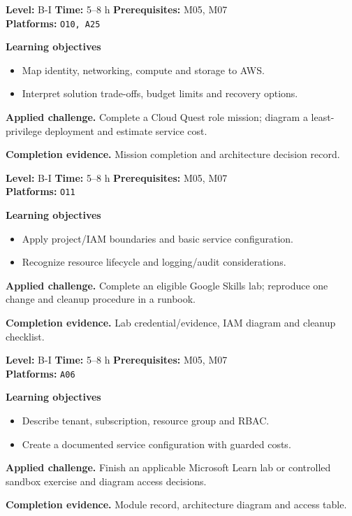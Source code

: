 \documentclass[10pt,letterpaper,oneside]{article}
\begin{document}
\vspace{2.5pt}
\begin{skillbox}[title={M12 \quad AWS cloud immersion}]
\textbf{Level:} B-I \quad \textbf{Time:} 5--8 h \quad \textbf{Prerequisites:} M05, M07\\
\textbf{Platforms:} \texttt{O10, A25}\par
\textbf{Learning objectives}
\begin{itemize}
\item Map identity, networking, compute and storage to AWS.
\item Interpret solution trade-offs, budget limits and recovery options.
\end{itemize}
\textbf{Applied challenge.} Complete a Cloud Quest role mission; diagram a least-privilege deployment and estimate service cost.\par
\textbf{Completion evidence.} Mission completion and architecture decision record.\par
\end{skillbox}
\vspace{2.5pt}
\begin{skillbox}[title={M13 \quad Google Cloud practical labs}]
\textbf{Level:} B-I \quad \textbf{Time:} 5--8 h \quad \textbf{Prerequisites:} M05, M07\\
\textbf{Platforms:} \texttt{O11}\par
\textbf{Learning objectives}
\begin{itemize}
\item Apply project/IAM boundaries and basic service configuration.
\item Recognize resource lifecycle and logging/audit considerations.
\end{itemize}
\textbf{Applied challenge.} Complete an eligible Google Skills lab; reproduce one change and cleanup procedure in a runbook.\par
\textbf{Completion evidence.} Lab credential/evidence, IAM diagram and cleanup checklist.\par
\end{skillbox}
\vspace{2.5pt}
\begin{skillbox}[title={M14 \quad Azure practical labs}]
\textbf{Level:} B-I \quad \textbf{Time:} 5--8 h \quad \textbf{Prerequisites:} M05, M07\\
\textbf{Platforms:} \texttt{A06}\par
\textbf{Learning objectives}
\begin{itemize}
\item Describe tenant, subscription, resource group and RBAC.
\item Create a documented service configuration with guarded costs.
\end{itemize}
\textbf{Applied challenge.} Finish an applicable Microsoft Learn lab or controlled sandbox exercise and diagram access decisions.\par
\textbf{Completion evidence.} Module record, architecture diagram and access table.\par
\end{skillbox}
\end{document}
